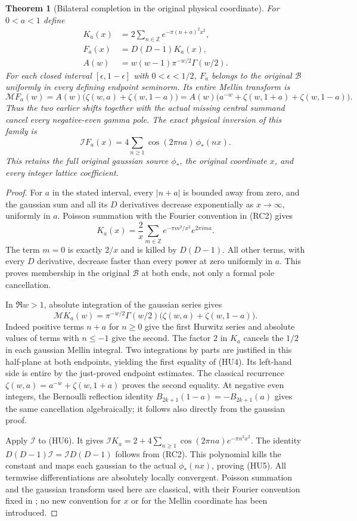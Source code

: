 \documentclass[11pt]{article}
\newtheorem{theorem}{Theorem}[section]
\newcommand{\B}{\mathscr B}\newcommand{\M}{\mathcal M}
\begin{document}
\begin{theorem}[Bilateral completion in the original physical coordinate]
For $0<a<1$ define
\[
 \begin{split}
 K_a(x)&=2\sum_{n\in\mathbb Z}e^{-\pi(n+a)^2x^2},\\
 F_a(x)&=D(D-1)K_a(x),\\
 A(w)&=w(w-1)\pi^{-w/2}\Gamma(w/2).
 \end{split}
 \tag{HU3}
\]
For each closed interval $[\epsilon,1-\epsilon]$ with
$0<\epsilon<1/2$, $F_a$ belongs to the original $\B$ uniformly
in every defining endpoint seminorm. Its entire Mellin transform is
\[
 \M F_a(w)=A(w)\bigl(\zeta(w,a)+\zeta(w,1-a)\bigr)
 =A(w)\bigl(a^{-w}+\zeta(w,1+a)+\zeta(w,1-a)\bigr).
 \tag{HU4}
\]
Thus the two earlier shifts together with the actual missing
central summand cancel every negative-even gamma pole. The exact
physical inversion of this family is
\[
 \mathcal IF_a(x)=4\sum_{n\ge1}
                \cos(2\pi na)\,\phi_*(nx).
 \tag{HU5}
\]
This retains the full original gaussian source $\phi_*$, the
original coordinate $x$, and every integer lattice coefficient.
\end{theorem}
\begin{proof}
For $a$ in the stated interval, every $|n+a|$ is bounded away
from zero, and the gaussian sum and all its $D$ derivatives
decrease exponentially as $x\to\infty$, uniformly in $a$.
Poisson summation with the Fourier convention in (RC2) gives
\[
 K_a(x)=\frac2x\sum_{m\in\mathbb Z}
             e^{-\pi m^2/x^2}e^{2\pi ima}.
 \tag{HU6}
\]
The term $m=0$ is exactly $2/x$ and is killed by $D(D-1)$.
All other terms, with every $D$ derivative, decrease faster than
every power at zero uniformly in $a$. This proves membership in
the original $\B$ at both ends, not only a formal pole cancellation.

In $\Re w>1$, absolute integration of the gaussian series gives
\[
 \M K_a(w)=\pi^{-w/2}\Gamma(w/2)
                  \bigl(\zeta(w,a)+\zeta(w,1-a)\bigr).
\]
Indeed positive terms $n+a$ for $n\ge0$ give the first Hurwitz
series and absolute values of terms with $n\le-1$ give the second.
The factor $2$ in $K_a$ cancels the $1/2$ in each gaussian
Mellin integral. Two integrations by parts are justified in this
half-plane at both endpoints, yielding the first equality of
(HU4). Its left-hand side is entire by the just-proved endpoint
estimates. The classical recurrence
$\zeta(w,a)=a^{-w}+\zeta(w,1+a)$ proves the second equality.
At negative even integers, the Bernoulli reflection identity
$B_{2k+1}(1-a)=-B_{2k+1}(a)$ gives the same cancellation
algebraically; it follows also directly from the gaussian proof.

Apply $\mathcal I$ to (HU6). It gives
$\mathcal IK_a=2+4\sum_{n\ge1}\cos(2\pi na)e^{-\pi n^2x^2}$.
The identity $D(D-1)\mathcal I=\mathcal ID(D-1)$ follows
from (RC2). This polynomial kills the constant and maps each
gaussian to the actual $\phi_*(nx)$, proving (HU5).
All termwise differentiations are absolutely locally convergent.
Poisson summation and the gaussian transform used here are
classical, with their Fourier convention fixed in
\cite{SteinFourier}; no new convention for $x$ or for the Mellin
coordinate has been introduced.
\end{proof}
\end{document}
